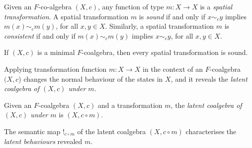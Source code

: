 \begin{definition}
Given an $F$-co-algebra $(X,c)$, any function of type $m\colon X\rightarrow X$ is a \emph{spatial} \emph{transformation}. %
A spatial transformation $m$ is \emph{sound} if and only if $x\sim_c y$ implies $m(x)\sim_{c} m(y)$, for all $x,y \in X$. Similarly, a spatial transformation $m$ is \emph{consistent} if and only if $m(x)\sim_{c} m(y)$ implies $x\sim_c y$, for all $x,y \in X$. %
\end{definition}
\begin{corollary}
    If $(X,c)$ is a minimal $F$-coalgebra, then every spatial transformation %
    is sound. %
\end{corollary}
Applying transformation function $m\colon X\rightarrow X$ in the context of an $F$-coalgebra $(X,c$) changes the normal behaviour of the states in $X$, and it reveals the \emph{latent coalgebra of $(X,c)$ under $m$}. 
\begin{definition}
Given an $F$-coalgebra $(X,c)$ and a transformation $m$, the \emph{latent coalgebra of $(X,c)$ under $m$} is $(X,c\circ m)$. 
\end{definition}
The semantic map $!_{c\circ m}$ %
of the latent coalgebra $(X,c\circ m)$ characterises the \emph{latent behaviours} revealed $m$. 

